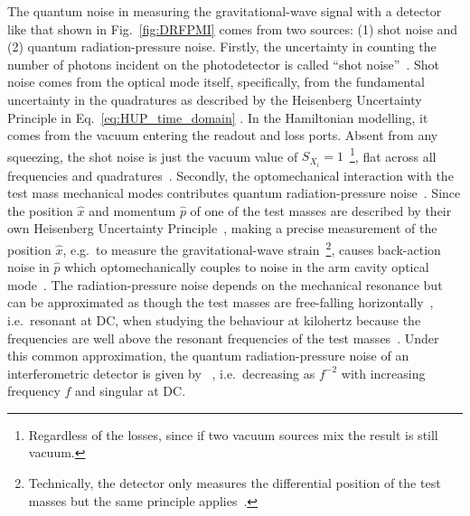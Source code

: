 The quantum noise in measuring the gravitational-wave signal with a detector like that shown in Fig.~\ref{fig:DRFPMI} comes from two sources: (1) shot noise and (2) quantum radiation-pressure noise.
Firstly, the uncertainty in counting the number of photons incident on the photodetector is called ``shot noise''~\cite{}.  Shot noise comes from the optical mode itself, specifically, from the fundamental uncertainty in the quadratures as described by the Heisenberg Uncertainty Principle in Eq.~\ref{eq:HUP_time_domain} . In the Hamiltonian modelling, it comes from the vacuum entering the readout and loss ports. Absent from any squeezing, the shot noise is just the vacuum value of $S_{X_i}=1$~\footnote{Regardless of the losses, since if two vacuum sources mix the result is still vacuum.}, flat across all frequencies and quadratures~\cite{}. 
Secondly, the optomechanical interaction with the test mass mechanical modes contributes quantum radiation-pressure noise~\cite{}. Since the position $\hat x$ and momentum $\hat p$ of one of the test masses are described by their own Heisenberg Uncertainty Principle~\cite{}, making a precise measurement of the position $\hat x$, e.g.\ to measure the gravitational-wave strain~\footnote{Technically, the detector only measures the differential position of the test masses but the same principle applies~\cite{}.}, causes back-action noise in $\hat p$ which optomechanically couples to noise in the arm cavity optical mode~\cite{}. The radiation-pressure noise depends on the mechanical resonance but can be approximated as though the test masses are free-falling horizontally~\cite{}, i.e.\ resonant at DC, when studying the behaviour at kilohertz because the frequencies are well above the resonant frequencies of the test masses~\cite{}. Under this common approximation, the quantum radiation-pressure noise of an interferometric detector is given by ~\cite{}, i.e.\ decreasing as $f^{-2}$ with increasing frequency $f$ and singular at DC. 
